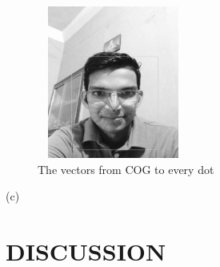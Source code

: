 \documentclass[a4paper,12pt,oneside]{article}
\begin{document}
\begin{figure}[H]
\centering
\includegraphics[height=5cm,width=5cm]{realtime2.jpg}
\caption{The vectors from COG to every dot}
\end{figure}
\begin{center}
(c)
\end{center}


\newpage
\section{DISCUSSION}
\end{document}
